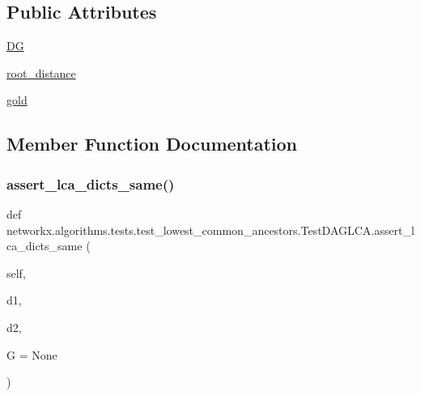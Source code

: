 \subsection*{Public Attributes}
\begin{DoxyCompactItemize}
\item 
\hyperlink{classnetworkx_1_1algorithms_1_1tests_1_1test__lowest__common__ancestors_1_1TestDAGLCA_a5e66c253a262c6c3f7779d1c3d2268ea}{DG}
\item 
\hyperlink{classnetworkx_1_1algorithms_1_1tests_1_1test__lowest__common__ancestors_1_1TestDAGLCA_a82f4ad87756092e961282cd4c44f3ed5}{root\+\_\+distance}
\item 
\hyperlink{classnetworkx_1_1algorithms_1_1tests_1_1test__lowest__common__ancestors_1_1TestDAGLCA_ad5c66b4f50c4d93a4eadf4afd8c4582c}{gold}
\end{DoxyCompactItemize}


\subsection{Member Function Documentation}
\mbox{\label{classnetworkx_1_1algorithms_1_1tests_1_1test__lowest__common__ancestors_1_1TestDAGLCA_ab26e53de613887ec15bd4929886eb430}} 
\subsubsection{\texorpdfstring{assert\+\_\+lca\+\_\+dicts\+\_\+same()}{assert\_lca\_dicts\_same()}}
{\footnotesize\ttfamily def networkx.\+algorithms.\+tests.\+test\+\_\+lowest\+\_\+common\+\_\+ancestors.\+Test\+D\+A\+G\+L\+C\+A.\+assert\+\_\+lca\+\_\+dicts\+\_\+same (\begin{DoxyParamCaption}\item[{}]{self,  }\item[{}]{d1,  }\item[{}]{d2,  }\item[{}]{G = {\ttfamily None} }\end{DoxyParamCaption})}


